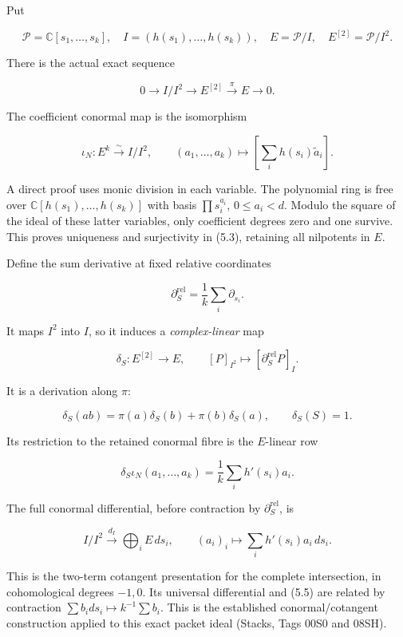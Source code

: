 Put

\[\mathcal P=\mathbb C[s_1,\ldots,s_k],\quad I=(h(s_1),\ldots,h(s_k)),\quad E=\mathcal P/I,\quad E^{[2]}=\mathcal P/I^2.\]

There is the actual exact sequence

\[\boxed{0\longrightarrow I/I^2\longrightarrow E^{[2]}\xrightarrow{\pi}E\longrightarrow0.}\tag{5.2}\]

The coefficient conormal map is the isomorphism

\[\boxed{\iota_N:E^k\xrightarrow{\sim}I/I^2,\qquad (a_1,\ldots,a_k)\mapsto[\sum_i h(s_i)\widetilde a_i].}\tag{5.3}\]

A direct proof uses monic division in each variable. The polynomial ring
is free over \(\mathbb C[h(s_1),\ldots,h(s_k)]\) with basis
\(\prod s_i^{a_i}\), \(0\le a_i<d\). Modulo the square of the ideal of
these latter variables, only coefficient degrees zero and one survive.
This proves uniqueness and surjectivity in (5.3), retaining all
nilpotents in \(E\).

Define the sum derivative at fixed relative coordinates

\[\partial_S^\mathrm{rel}=\frac1k\sum_i\partial_{s_i}.\tag{5.4}\]

It maps \(I^2\) into \(I\), so it induces a \emph{complex-linear} map

\[\boxed{\delta_S:E^{[2]}\longrightarrow E,\qquad[P]_{I^2}\mapsto[\partial_S^\mathrm{rel}P]_I.}\tag{5.5}\]

It is a derivation along \(\pi\):

\[\delta_S(ab)=\pi(a)\delta_S(b)+\pi(b)\delta_S(a),\qquad\delta_S(S)=1.\]

Its restriction to the retained conormal fibre is the \(E\)-linear row

\[\boxed{\delta_S\iota_N(a_1,\ldots,a_k)=\frac1k\sum_i h'(s_i)a_i.}\tag{5.6}\]

The full conormal differential, before contraction by
\(\partial_S^{\mathrm{rel}}\), is

\[I/I^2\xrightarrow{d_I}\bigoplus_iE\,ds_i,\qquad
(a_i)_i\mapsto\sum_i h'(s_i)a_i\,ds_i.\tag{5.7}\]

This is the two-term cotangent presentation for the complete
intersection, in cohomological degrees \(-1,0\). Its universal
differential and (5.5) are related by contraction
\(\sum b_i ds_i\mapsto k^{-1}\sum b_i\). This is the established
conormal/cotangent construction applied to this exact packet ideal
(Stacks, Tags 00S0 and 08SH).

